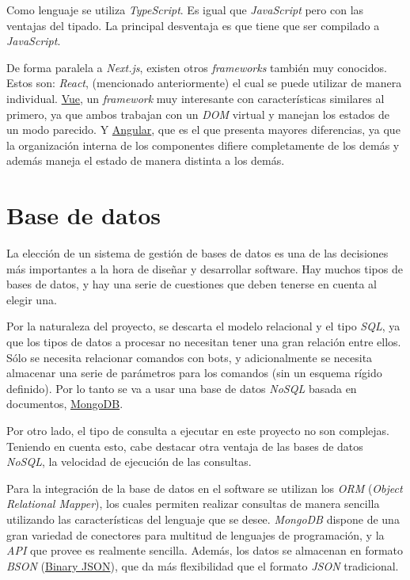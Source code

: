 Como lenguaje se utiliza \textit{TypeScript}. Es igual que \textit{JavaScript} pero con las ventajas del tipado. La principal desventaja es que tiene que ser compilado a \textit{JavaScript}.

De forma paralela a \textit{Next.js}, existen otros \textit{frameworks} también muy conocidos. Estos son: \textit{React}, (mencionado anteriormente) el cual se puede utilizar de manera individual. \href{https://vuejs.org/}{Vue}, un \textit{framework} muy interesante con características similares al primero, ya que ambos trabajan con un \textit{DOM} virtual y manejan los estados de un modo parecido. Y \href{https://angular.io/}{Angular}, que es el que presenta mayores diferencias, ya que la organización interna de los componentes difiere completamente de los demás y además maneja el estado de manera distinta a los demás.


\section{Base de datos}

La elección de un sistema de gestión de bases de datos es una de las decisiones más importantes a la hora de diseñar y desarrollar software. Hay muchos tipos de bases de datos, y hay una serie de cuestiones que deben tenerse en cuenta al elegir una.

Por la naturaleza del proyecto, se descarta el modelo relacional y el tipo \textit{SQL}, ya que los tipos de datos a procesar no necesitan tener una gran relación entre ellos. Sólo se necesita relacionar comandos con bots, y adicionalmente se necesita almacenar una serie de parámetros para los comandos (sin un esquema rígido definido). Por lo tanto se va a usar una base de datos \textit{NoSQL} basada en documentos, \href{https://www.mongodb.com/es}{MongoDB}.

Por otro lado, el tipo de consulta a ejecutar en este proyecto no son complejas. Teniendo en cuenta esto, cabe destacar otra ventaja de las bases de datos \textit{NoSQL}, la velocidad de ejecución de las consultas.

Para la integración de la base de datos en el software se utilizan los \textit{ORM} (\textit{Object Relational Mapper}), los cuales permiten realizar consultas de manera sencilla utilizando las características del lenguaje que se desee. \textit{MongoDB} dispone de una gran variedad de conectores para multitud de lenguajes de programación, y la \textit{API} que provee es realmente sencilla. Además, los datos se almacenan en formato \textit{BSON} (\href{https://www.mongodb.com/json-and-bson}{Binary JSON}), que da más flexibilidad que el formato \textit{JSON} tradicional.

